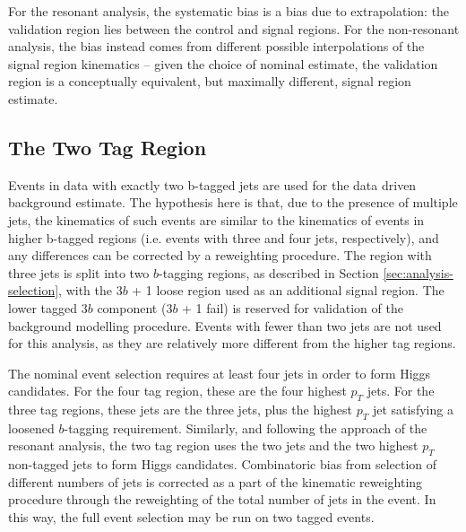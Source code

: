 For the resonant analysis, the systematic bias is a bias due to extrapolation:
the validation region lies between the control and signal regions. For the 
non-resonant analysis, the bias instead comes from different possible interpolations
of the signal region kinematics -- given the choice of nominal estimate, the validation
region is a conceptually equivalent, but maximally different, signal region estimate.

\subsection{The Two Tag Region}

Events in data with exactly two b-tagged jets are used for the data driven 
background estimate. The hypothesis here is that, due to the presence of 
multiple \btagged jets, the kinematics of such events are similar to the 
kinematics of events in higher b-tagged regions (i.e. events with three and 
four \btagged jets, respectively), and any differences can be corrected by a 
reweighting procedure. The region with three \btagged jets is split into 
two $b$-tagging regions, as described in Section \ref{sec:analysis-selection}, 
with the 3$b$ + 1 loose region used as an additional signal 
region. The lower tagged 3$b$ component (3$b$ + 1 fail) is reserved for validation
of the background modelling procedure. Events with fewer than two \btagged jets are not 
used for this analysis, as they are relatively more different from the higher tag regions.

The nominal event selection requires at least four jets in order to form Higgs
candidates. For the four tag region, these are the four highest $p_{T}$ \btagged 
jets. For the three tag regions, these jets are the three \btagged jets, plus the 
highest $p_{T}$ jet satisfying a loosened $b$-tagging requirement. Similarly, and following 
the approach of the resonant analysis, the two tag region uses the two \btagged jets 
and the two highest $p_{T}$ non-tagged jets to form Higgs candidates. Combinatoric bias 
from selection of different numbers of \btagged jets is corrected as a part of the kinematic 
reweighting procedure through the reweighting of the total number of jets in the event. In this way, 
the full event selection may be run on two tagged events. 

